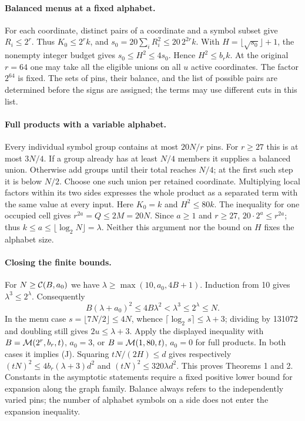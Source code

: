 \documentclass[
  11pt,
]{article}
\newcommand{\floor}[1]{\lfloor #1\rfloor}
\newcommand{\ceil}[1]{\lceil #1\rceil}
\begin{document}
\paragraph{Balanced menus at a fixed alphabet.}
For each coordinate, distinct pairs of a coordinate and a symbol subset
give \(R_i\le2^r\). Thus \(K_0\le2^r k\), and
\(s_0=20\sum_iR_i^2\le20\,2^{2r}k\). With
\(H=\floor{\sqrt{s_0}}+1\), the nonempty integer budget gives
\(s_0\le H^2\le4s_0\). Hence \(H^2\le b_r k\). At the original
\(r=64\) one may take all the eligible unions on all \(u\) active
coordinates. The factor \(2^{64}\) is fixed. The sets of pins,
their balance, and the list of possible pairs are determined before the
signs are assigned; the terms may use different cuts in this list.

\paragraph{Full products with a variable alphabet.}
Every individual symbol group contains at most \(20N/r\) pins. For
\(r\ge27\) this is at most \(3N/4\). If a group already has at least
\(N/4\) members it supplies a balanced union. Otherwise add groups until
their total reaches \(N/4\); at the first such step it is below \(N/2\).
Choose one such union per retained coordinate. Multiplying local factors
within its two sides expresses the whole product as a separated term with
the same value at every input. Here \(K_0=k\) and \(H^2\le80k\). The
inequality for one occupied cell gives \(r^{2a}=Q\le 2M=20N\).
Since \(a\ge1\) and \(r\ge27\), \(20\cdot2^a\le r^{2a}\);
thus \(k\le a\le\floor{\log_2N}=\lambda\). Neither this argument nor
the bound on \(H\) fixes the alphabet size.

\paragraph{Closing the finite bounds.}
For \(N\ge{\cal C}(B,a_0)\) we have \(\lambda\ge\max(10,a_0,4B+1)\).
Induction from 10 gives \(\lambda^3\le 2^\lambda\). Consequently
\[
 B(\lambda+a_0)^2\le4B\lambda^2<\lambda^3\le 2^\lambda\le N .
\]
In the menu case \(s=\floor{7N/2}\le4N\), whence
\(\ceil{\log_2 s}\le\lambda+3\); dividing by 131072 and doubling
still gives \(2u\le\lambda+3\). Apply the displayed inequality with
\(B={\cal M}(2^r,b_r,t)\), \(a_0=3\), or
\(B={\cal M}(1,80,t)\), \(a_0=0\) for full products. In both cases it
implies (J). Squaring \(tN/(2H)\le d\) gives respectively
\((tN)^2\le4 b_r(\lambda+3)d^2\) and \((tN)^2\le320\lambda d^2\).
This proves Theorems 1 and 2. Constants in the asymptotic statements
require a fixed positive lower bound for expansion along the graph family.
Balance always refers to the independently varied pins; the number of
alphabet symbols on a side does not enter the expansion inequality.
\end{document}
